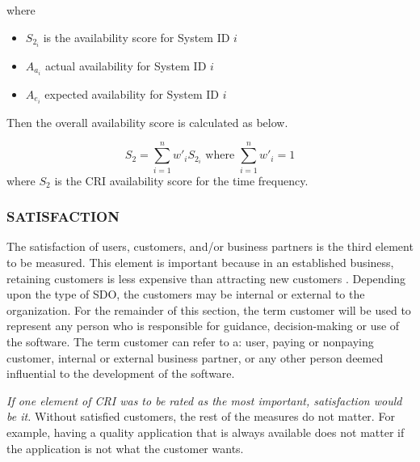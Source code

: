 \documentclass[SDSUThesis.tex]{subfiles}
\begin{document}
                where
                
                \begin{itemize}
                    \item $S_{2_i}$ is the availability score for System ID $i$
                    \item $A_{a_i}$ actual availability for System ID $i$
                    \item $A_{e_i}$ expected availability for System ID $i$
                \end{itemize}
                
                Then the overall availability score is calculated as below.
                
                \[
                    S_{2} = \sum\limits^n_{i=1} w'_i S_{2_i} \text{ where } \sum\limits^n_{i=1} w'_i = 1
                \]
                where $S_2$ is the CRI availability score for the time frequency.
                
        \subsubsection{SATISFACTION}
            The satisfaction of users, customers, and/or business partners is 
            the third element to be measured.  This element is important because 
            in an established business, retaining customers is less expensive
            than attracting new customers \cite{Aulet2013}.  
            Depending upon the type of SDO,
            the customers may be internal or external to the organization.  For
            the remainder of this section, the term customer will be used
            to represent any person who is responsible for guidance, decision-making
            or use of the software.  The term customer can refer to a: user, paying or nonpaying
            customer, internal or external business partner, or any other person deemed influential
            to the development of the software.
            
            \textit{If one element of CRI was to be rated as the most important, satisfaction
            would be it.}  
            Without satisfied customers, the rest of the measures do not matter.
            For example, having a quality
            application that is always available does not matter if the
            application is not what the customer wants.  
            
\end{document}
